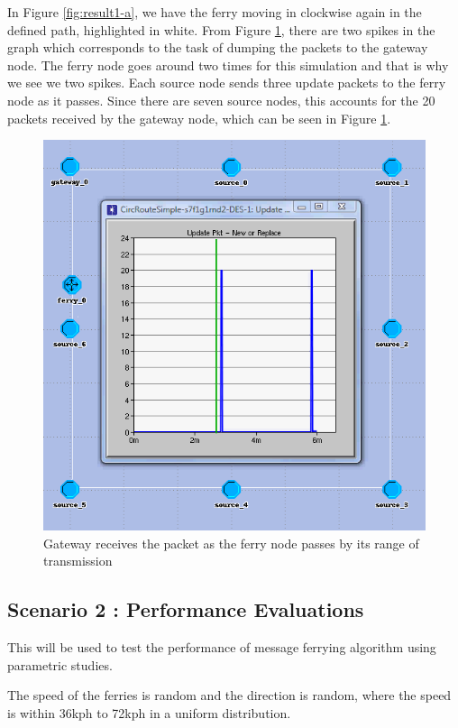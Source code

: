 In Figure \ref{fig:result1-a}, we have the ferry moving in clockwise again in the defined path, highlighted in white.  
From Figure \ref{fig:result1-b}, there are two spikes in the graph which corresponds to the task of dumping the packets to the gateway node.  
The ferry node goes around two times for this simulation and that is why we see we two spikes.  
Each source node sends three update packets to the ferry node as it passes.  
Since there are seven source nodes, this accounts for the 20 packets received by the gateway node, which can be seen in Figure \ref{fig:result1-b}.


\begin{figure}[h]
    \centering
    \includegraphics[width=.5\textwidth]{images/scenario1-result-gateway}
    \caption{Gateway receives the packet as the ferry node passes by its range of transmission}
    \label{fig:result1-b}
\end{figure}




\subsection{Scenario 2 : Performance Evaluations}
\label{sec:scenario2}

This will be used to test the performance of message ferrying algorithm using parametric studies.  

The speed of the ferries is random and the direction is random, where the speed is within 36kph to 72kph in a uniform distribution.  

